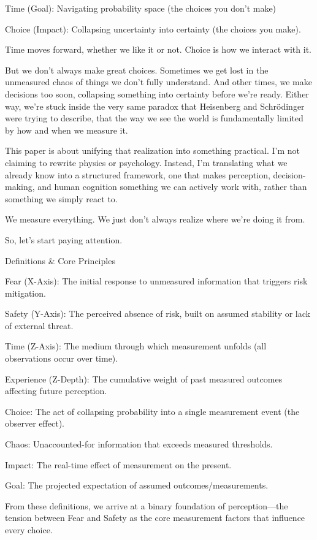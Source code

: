 \documentclass[11pt]{article}
\begin{document}
Time (Goal): Navigating probability space (the choices you don’t make)

Choice (Impact): Collapsing uncertainty into certainty (the choices you make).

Time moves forward, whether we like it or not. Choice is how we interact with it.

But we don’t always make great choices. Sometimes we get lost in the unmeasured chaos of things we don’t fully understand. And other times, we make decisions too soon, collapsing something into certainty before we’re ready. Either way, we’re stuck inside the very same paradox that Heisenberg and Schrödinger were trying to describe, that the way we see the world is fundamentally limited by how and when we measure it.

This paper is about unifying that realization into something practical. I’m not claiming to rewrite physics or psychology. Instead, I’m translating what we already know into a structured framework, one that makes perception, decision-making, and human cognition something we can actively work with, rather than something we simply react to.

We measure everything. We just don’t always realize where we’re doing it from.

So, let’s start paying attention.

Definitions & Core Principles

Fear (X-Axis): The initial response to unmeasured information that triggers risk mitigation.

Safety (Y-Axis): The perceived absence of risk, built on assumed stability or lack of external threat.

Time (Z-Axis): The medium through which measurement unfolds (all observations occur over time).

Experience (Z-Depth): The cumulative weight of past measured outcomes affecting future perception.

Choice: The act of collapsing probability into a single measurement event (the observer effect).

Chaos: Unaccounted-for information that exceeds measured thresholds. 

Impact: The real-time effect of measurement on the present.

Goal: The projected expectation of assumed outcomes/measurements.

From these definitions, we arrive at a binary foundation of perception—the tension between Fear and Safety as the core measurement factors that influence every choice.
\end{document}
